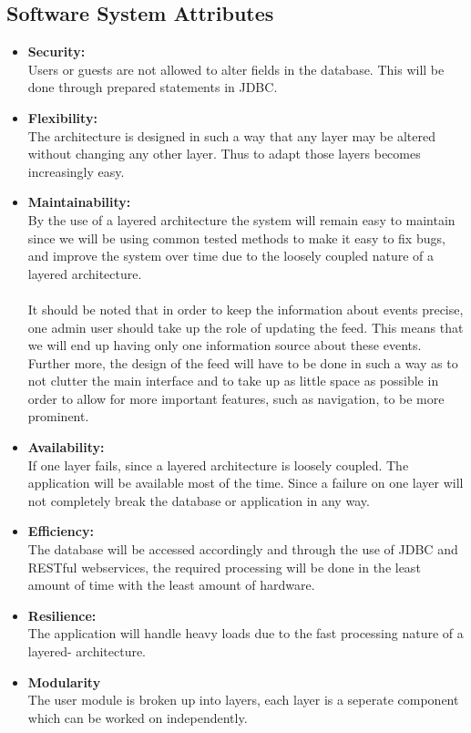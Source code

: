 \documentclass{article}
\begin{document}
	
	\subsection{Software System Attributes}
	\begin{itemize}
		\item \textbf{Security:}
		\\Users or guests are not allowed to alter fields in the database. This will be done through prepared statements in JDBC.
		
		\item \textbf{Flexibility:}
		\\The architecture is designed in such a way that any layer  may be altered without changing any other layer. Thus to adapt those layers becomes increasingly easy.
		
		\item \textbf{Maintainability:}
		\\By the use of a layered architecture the system will remain easy to maintain since we will be using common tested methods to make it easy to fix bugs, and improve the system over time due to the loosely coupled nature of a layered architecture.\\\\
		It should be noted that in order to keep the information about events precise, one admin user should take up the role of updating the feed.
		This means that we will end up having only one information source about these events. Further more, the design of the feed will have to be done in such a way as to not clutter the main interface and to take up as little space as possible in order to allow for more important features, such as navigation, to be more prominent.
		
		\item \textbf{Availability:}
		\\If one layer fails, since a layered architecture is loosely coupled. The application will be available most of the time. Since a failure on one layer will not completely break the database or application in any way.
		
		\item \textbf{Efficiency:}
		\\The database will be accessed accordingly and through the use of JDBC and RESTful webservices, the required processing will be done in the least amount of time with the least amount of hardware.
		
		\item \textbf{Resilience:}
		\\The application will handle heavy loads due to the fast processing nature of a layered- architecture.
		
		\item \textbf{Modularity}
		\\The user module is broken up into layers, each layer is a seperate component which can be worked on independently.
	\end{itemize}
	
\end{document}

